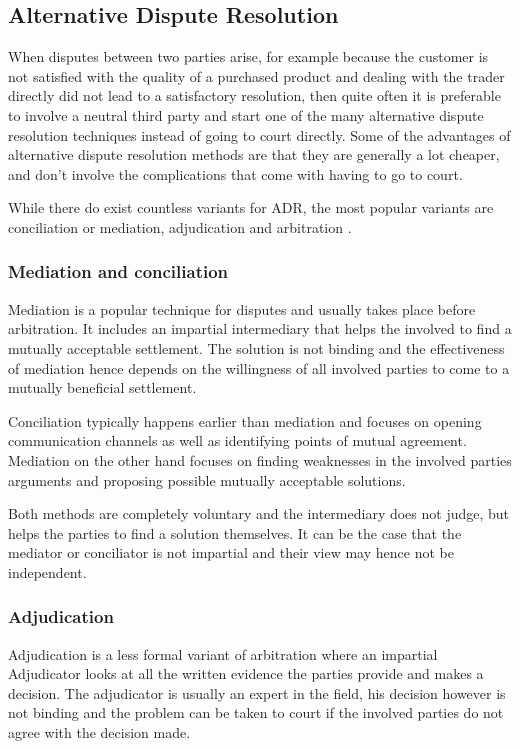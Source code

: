 \documentclass[12pt,msc,a4paper,oneside]{ucl_thesis}
\begin{document}
\subsection{Alternative Dispute Resolution}
When disputes between two parties arise, for example because the customer is not satisfied with the quality of a purchased product and dealing with the trader directly did not lead to a satisfactory resolution, then quite often it is preferable to involve a neutral third party and start one of the many alternative dispute resolution techniques instead of going to court directly. Some of the advantages of alternative dispute resolution methods are that they are generally a lot cheaper, and don't involve the complications that come with having to go to court. \cite{adr_overview:findlaw}

While there do exist countless variants for ADR, the most popular variants are conciliation or mediation, adjudication and arbitration \cite{using_adr:citizensadvice}.

\subsubsection{Mediation and conciliation}
Mediation is a popular technique for disputes and usually takes place before arbitration. It includes an impartial intermediary that helps the involved to find a mutually acceptable settlement. The solution is not binding and the effectiveness of mediation hence depends on the willingness of all involved parties to come to a mutually beneficial settlement.

Conciliation typically happens earlier than mediation and focuses on opening communication channels as well as identifying points of mutual agreement. Mediation on the other hand focuses on finding weaknesses in the involved parties arguments and proposing possible mutually acceptable solutions.

Both methods are completely voluntary and the intermediary does not judge, but helps the parties to find a solution themselves. It can be the case that the mediator or conciliator is not impartial and their view may hence not be independent. \cite{using_adr:citizensadvice}

\subsubsection{Adjudication}
Adjudication is a less formal variant of arbitration where an impartial Adjudicator looks at all the written evidence the parties provide and makes a decision. The adjudicator is usually an expert in the field, his decision however is not binding and the problem can be taken to court if the involved parties do not agree with the decision made. \cite{using_adr:citizensadvice}
\end{document}
